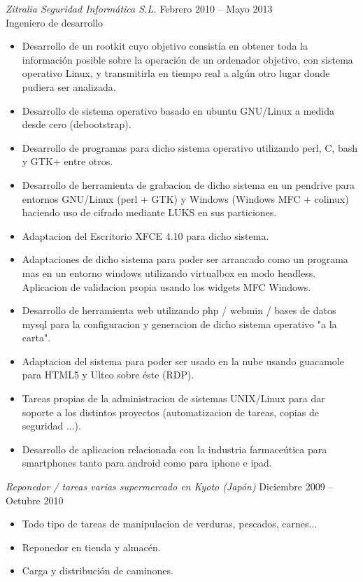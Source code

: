 \documentclass[10pt]{res} %
\begin{document}
\begin{resume}
{\sl Zitralia Seguridad Informática S.L.} \hfill Febrero 2010 -- Mayo 2013\\
\hfill Ingeniero de desarrollo
\begin{itemize} \itemsep -2pt %
\item Desarrollo de un rootkit cuyo objetivo consistía en obtener toda la información posible sobre la operación de un ordenador objetivo, con sistema operativo Linux, y transmitirla en tiempo real a algún otro lugar donde pudiera ser analizada.
\item Desarrollo de sistema operativo basado en ubuntu GNU/Linux a medida desde cero (debootstrap). 
\item Desarrollo de programas para dicho sistema operativo utilizando perl, C, bash y GTK+ entre otros.
\item Desarrollo de herramienta de grabacion de dicho sistema en un pendrive para entornos GNU/Linux (perl + GTK) y Windows (Windows MFC + colinux) haciendo uso de cifrado mediante LUKS en sus particiones. 
\item Adaptacion del Escritorio XFCE 4.10 para dicho sistema.
\item Adaptaciones de dicho sistema para poder ser arrancado como un programa mas en un entorno windows utilizando virtualbox en modo headless. Aplicacion de validacion propia usando los widgets MFC Windows.
\item Desarrollo de herramienta web utilizando php / webmin / bases de datos mysql para la configuracion y generacion de dicho sistema operativo "a la carta".
\item Adaptacion del sistema para poder ser usado en la nube usando guacamole para HTML5 y Ulteo sobre éste (RDP).
\item Tareas propias de la administracion de sistemas UNIX/Linux para dar soporte a los distintos proyectos (automatizacion de tareas, copias de seguridad ...). 
\item Desarrollo de aplicacion relacionada con la industria farmaceútica para smartphones tanto para android como para iphone e ipad.
\end{itemize}

{\sl Reponedor / tareas varias supermercado en Kyoto (Japón)} \hfill Diciembre 2009 -- Octubre 2010\\
\begin{itemize} \itemsep -2pt %
\item Todo tipo de tareas de manipulacion de verduras, pescados, carnes...
\item Reponedor en tienda y almacén.
\item Carga y distribución de caminones.
\end{itemize} 


\end{resume}
\end{document}
